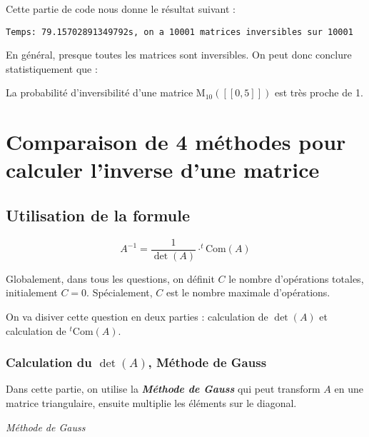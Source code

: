 \documentclass{article}
\begin{document}
Cette partie de code nous donne le résultat suivant :

\begin{lstlisting}
Temps: 79.15702891349792s, on a 10001 matrices inversibles sur 10001
\end{lstlisting}

En général, presque toutes les matrices sont inversibles. On peut donc conclure statistiquement que : 

\begin{tcolorbox}
    La probabilité d'inversibilité d'une matrice $\mathrm{M} _{10}( [\![0, 5]\!])$ est très proche de 1.
\end{tcolorbox}
\newpage

\section{Comparaison de 4 méthodes pour calculer l'inverse d'une matrice}

\subsection{Utilisation de la formule}

\[
A^{-1} =  \frac{1}{\det(A)} \cdot ^t \text{Com}(A)
\]

\begin{tcolorbox}
        Globalement, dans tous les questions, on définit $C$ le nombre d'opérations totales, initialement $C=0$. Spécialement, $C$ est le nombre maximale d'opérations.
\end{tcolorbox}

On va disiver cette question en deux parties : calculation de $\det(A)$ et calculation de $^t \text{Com}(A)$.

\subsubsection{Calculation du $\det(A)$, Méthode de Gauss} \label{1}

Dans cette partie, on utilise la \textit{\bf{Méthode de Gauss}} qui peut transform $A$ en une matrice triangulaire, ensuite multiplie les éléments sur le diagonal.

\noindent\textit{Méthode de Gauss}
\end{document}
